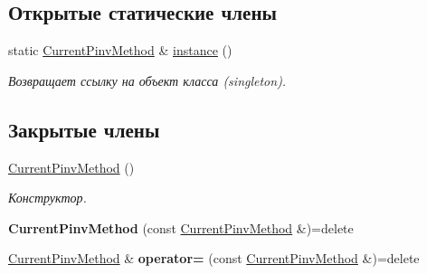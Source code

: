 \subsection*{Открытые статические члены}
\begin{DoxyCompactItemize}
\item 
static \hyperlink{class_math_1_1_lin_alg_1_1_current_pinv_method}{Current\+Pinv\+Method} \& \hyperlink{class_math_1_1_lin_alg_1_1_current_pinv_method_a663575ba99f3a0a5359baacdcd410539}{instance} ()\hypertarget{class_math_1_1_lin_alg_1_1_current_pinv_method_a663575ba99f3a0a5359baacdcd410539}{}\label{class_math_1_1_lin_alg_1_1_current_pinv_method_a663575ba99f3a0a5359baacdcd410539}

\begin{DoxyCompactList}\small\item\em Возвращает ссылку на объект класса (singleton). \end{DoxyCompactList}\end{DoxyCompactItemize}
\subsection*{Закрытые члены}
\begin{DoxyCompactItemize}
\item 
\hyperlink{class_math_1_1_lin_alg_1_1_current_pinv_method_a21292458d8909e25f2c38999de7f07c3}{Current\+Pinv\+Method} ()\hypertarget{class_math_1_1_lin_alg_1_1_current_pinv_method_a21292458d8909e25f2c38999de7f07c3}{}\label{class_math_1_1_lin_alg_1_1_current_pinv_method_a21292458d8909e25f2c38999de7f07c3}

\begin{DoxyCompactList}\small\item\em Конструктор. \end{DoxyCompactList}\item 
{\bfseries Current\+Pinv\+Method} (const \hyperlink{class_math_1_1_lin_alg_1_1_current_pinv_method}{Current\+Pinv\+Method} \&)=delete\hypertarget{class_math_1_1_lin_alg_1_1_current_pinv_method_a41e66230275afe98d7c7a14dcf98e466}{}\label{class_math_1_1_lin_alg_1_1_current_pinv_method_a41e66230275afe98d7c7a14dcf98e466}

\item 
\hyperlink{class_math_1_1_lin_alg_1_1_current_pinv_method}{Current\+Pinv\+Method} \& {\bfseries operator=} (const \hyperlink{class_math_1_1_lin_alg_1_1_current_pinv_method}{Current\+Pinv\+Method} \&)=delete\hypertarget{class_math_1_1_lin_alg_1_1_current_pinv_method_a1b176bac6635060313ad235ef366cb8b}{}\label{class_math_1_1_lin_alg_1_1_current_pinv_method_a1b176bac6635060313ad235ef366cb8b}

\end{DoxyCompactItemize}
